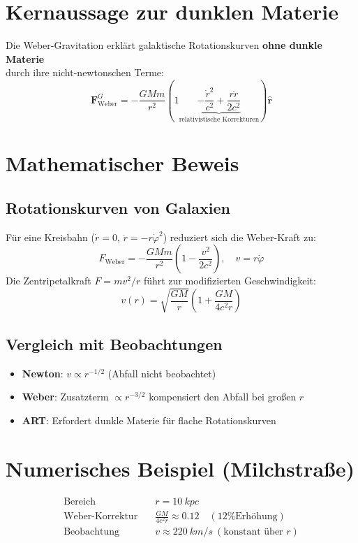 \section{Kernaussage zur dunklen Materie}
Die Weber-Gravitation erklärt galaktische Rotationskurven \textbf{ohne dunkle Materie}\\durch ihre nicht-newtonschen Terme:
\begin{equation}
\mathbf{F}_{\text{Weber}}^G = -\frac{GMm}{r^2}\left(1 \underbrace{-\frac{\dot{r}^2}{c^2} + \frac{r\ddot{r}}{2c^2}}_{\text{relativistische Korrekturen}}\right)\mathbf{\hat{r}}
\end{equation}

\section*{Mathematischer Beweis}

\subsection*{Rotationskurven von Galaxien}
Für eine Kreisbahn (\(\dot{r}=0\), \(\ddot{r} = -r\dot{\varphi}^2\)) reduziert sich die Weber-Kraft zu:
\begin{equation}
F_{\text{Weber}} = -\frac{GMm}{r^2}\left(1 - \frac{v^2}{2c^2}\right), \quad v = r\dot{\varphi}
\end{equation}
Die Zentripetalkraft \(F = mv^2/r\) führt zur modifizierten Geschwindigkeit:
\begin{equation}
v(r) = \sqrt{\frac{GM}{r}} \left(1 + \frac{GM}{4c^2r}\right)
\end{equation}

\subsection*{Vergleich mit Beobachtungen}
\begin{itemize}
\item \textbf{Newton}: \(v \propto r^{-1/2}\) (Abfall nicht beobachtet)
\item \textbf{Weber}: Zusatzterm \(\propto r^{-3/2}\) kompensiert den Abfall bei großen \(r\)
\item \textbf{ART}: Erfordert dunkle Materie für flache Rotationskurven
\end{itemize}

\section*{Numerisches Beispiel (Milchstraße)}
\begin{align*}
\text{Bereich} &\quad r = \SI{10}{kpc} \\
\text{Weber-Korrektur} &\quad \frac{GM}{4c^2r} \approx 0.12 \quad (\text{12\% Erhöhung}) \\
\text{Beobachtung} &\quad v \approx \SI{220}{km/s} \ (\text{konstant über } r)
\end{align*}

